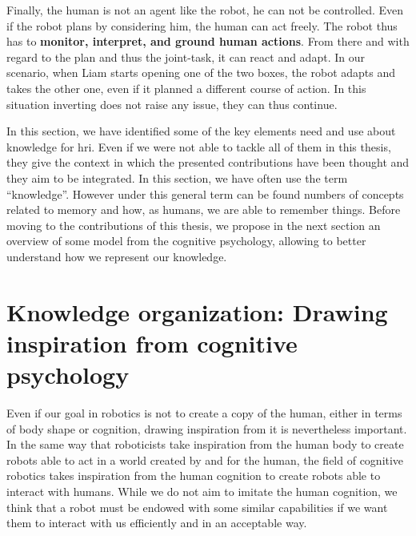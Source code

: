 Finally, the human is not an agent like the robot, he can not be controlled. Even if the robot plans by considering him, the human can act freely. The robot thus has to \textbf{monitor, interpret, and ground human actions}. From there and with regard to the plan and thus the joint-task, it can react and adapt. In our scenario, when Liam starts opening one of the two boxes, the robot adapts and takes the other one, even if it planned a different course of action. In this situation inverting does not raise any issue, they can thus continue.

In this section, we have identified some of the key elements need and use about knowledge for \acrfull{hri}. Even if we were not able to tackle all of them in this thesis, they give the context in which the presented contributions have been thought and they aim to be integrated. In this section, we have often use the term ``knowledge''. However under this general term can be found numbers of concepts related to memory and how, as humans, we are able to remember things. Before moving to the contributions of this thesis, we propose in the next section an overview of some model from the cognitive psychology, allowing to better understand how we represent our knowledge.

\section[Knowledge organization]{Knowledge organization: Drawing inspiration from cognitive psychology }

Even if our goal in robotics is not to create a copy of the human, either in terms of body shape or cognition, drawing inspiration from it is nevertheless important. In the same way that roboticists take inspiration from the human body to create robots able to act in a world created by and for the human, the field of cognitive robotics takes inspiration from the human cognition to create robots able to interact with humans. While we do not aim to imitate the human cognition, we think that a robot must be endowed with some similar capabilities if we want them to interact with us efficiently and in an acceptable way.

